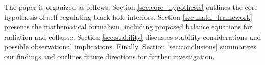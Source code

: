The paper is organized as follows: Section \ref{sec:core_hypothesis} outlines the core hypothesis of self-regulating black hole interiors. Section \ref{sec:math_framework} presents the mathematical formalism, including proposed balance equations for radiation and collapse. Section \ref{sec:stability} discusses stability considerations and possible observational implications. Finally, Section \ref{sec:conclusions} summarizes our findings and outlines future directions for further investigation.

